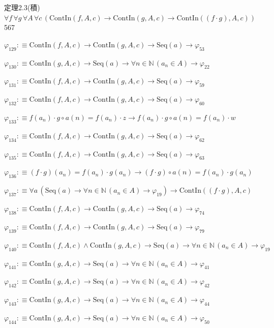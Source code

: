 \begin{fullproof}{定理2.3(積)}{$\forall f\,\forall g\,\forall A\,\forall c\,(\mathrm{ContIn}(f,A,c) \to \mathrm{ContIn}(g,A,c) \to \mathrm{ContIn}((f \cdot g),A,c))$}{567}
\begin{abbrevlist}
\item $\varphi_{129} :\equiv \mathrm{ContIn}(f,A,c) \to \mathrm{ContIn}(g,A,c) \to \mathrm{Seq}(a) \to \varphi_{53}$
\item $\varphi_{130} :\equiv \mathrm{ContIn}(g,A,c) \to \mathrm{Seq}(a) \to \forall n \in \mathbb{N}\,(a_{n} \in A) \to \varphi_{22}$
\item $\varphi_{131} :\equiv \mathrm{ContIn}(f,A,c) \to \mathrm{ContIn}(g,A,c) \to \mathrm{Seq}(a) \to \varphi_{59}$
\item $\varphi_{132} :\equiv \mathrm{ContIn}(f,A,c) \to \mathrm{ContIn}(g,A,c) \to \mathrm{Seq}(a) \to \varphi_{60}$
\item $\varphi_{133} :\equiv f(a_{n}) \cdot g \circ a(n) = f(a_{n}) \cdot z \to f(a_{n}) \cdot g \circ a(n) = f(a_{n}) \cdot w$
\item $\varphi_{134} :\equiv \mathrm{ContIn}(f,A,c) \to \mathrm{ContIn}(g,A,c) \to \mathrm{Seq}(a) \to \varphi_{62}$
\item $\varphi_{135} :\equiv \mathrm{ContIn}(f,A,c) \to \mathrm{ContIn}(g,A,c) \to \mathrm{Seq}(a) \to \varphi_{63}$
\item $\varphi_{136} :\equiv (f \cdot g)(a_{n}) = f(a_{n}) \cdot g(a_{n}) \to (f \cdot g) \circ a(n) = f(a_{n}) \cdot g(a_{n})$
\item $\varphi_{137} :\equiv \forall a\,(\mathrm{Seq}(a) \to \forall n \in \mathbb{N}\,(a_{n} \in A) \to \varphi_{19}) \to \mathrm{ContIn}((f \cdot g),A,c)$
\item $\varphi_{138} :\equiv \mathrm{ContIn}(f,A,c) \to \mathrm{ContIn}(g,A,c) \to \mathrm{Seq}(a) \to \varphi_{74}$
\item $\varphi_{139} :\equiv \mathrm{ContIn}(f,A,c) \to \mathrm{ContIn}(g,A,c) \to \mathrm{Seq}(a) \to \varphi_{79}$
\item $\varphi_{140} :\equiv \mathrm{ContIn}(f,A,c) \land \mathrm{ContIn}(g,A,c) \to \mathrm{Seq}(a) \to \forall n \in \mathbb{N}\,(a_{n} \in A) \to \varphi_{19}$
\item $\varphi_{141} :\equiv \mathrm{ContIn}(g,A,c) \to \mathrm{Seq}(a) \to \forall n \in \mathbb{N}\,(a_{n} \in A) \to \varphi_{41}$
\item $\varphi_{142} :\equiv \mathrm{ContIn}(g,A,c) \to \mathrm{Seq}(a) \to \forall n \in \mathbb{N}\,(a_{n} \in A) \to \varphi_{42}$
\item $\varphi_{143} :\equiv \mathrm{ContIn}(g,A,c) \to \mathrm{Seq}(a) \to \forall n \in \mathbb{N}\,(a_{n} \in A) \to \varphi_{44}$
\item $\varphi_{144} :\equiv \mathrm{ContIn}(g,A,c) \to \mathrm{Seq}(a) \to \forall n \in \mathbb{N}\,(a_{n} \in A) \to \varphi_{50}$

\end{abbrevlist}
\end{fullproof}
